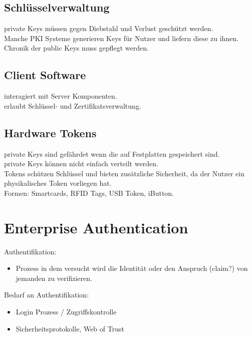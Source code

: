 \documentclass{article} %
\begin{document}
\subsection{Schlüsselverwaltung}
private Keys müssen gegen Diebstahl und Verlust geschützt werden.\\
Manche PKI Systeme generieren Keys für Nutzer und liefern diese zu ihnen.\\
Chronik der public Keys muss gepflegt werden.\\
\subsection{Client Software}
interagiert mit Server Komponenten.\\
erlaubt Schlüssel- und Zertifikatsverwaltung.\\
\subsection{Hardware Tokens}
private Keys sind gefährdet wenn die auf Festplatten gespeichert sind.\\
private Keys können nicht einfach verteilt werden.\\
Tokens schützen Schlüssel und bieten zusätzliche Sicherheit, da der Nutzer ein physikalisches Token vorliegen hat.\\
Formen: Smartcards, RFID Tags, USB Token, iButton.

\section{Enterprise Authentication}
Authentifikation:
\begin{itemize}
	\item Prozess in dem versucht wird die Identität oder den Anspruch (claim?) von jemanden zu verifizieren.
\end{itemize}
Bedarf an Authentifikation:
\begin{itemize}
	\item Login Prozess / Zugriffskontrolle
    \item Sicherheitsprotokolle, Web of Trust
\end{itemize}
\end{document}
